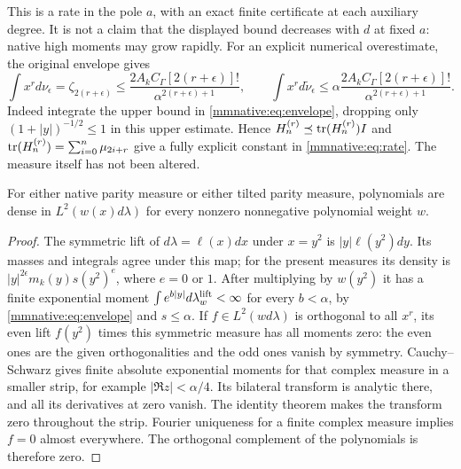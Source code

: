 \documentclass[11pt]{article}
\begin{document}
This is a rate in the pole $a$, with an exact finite certificate at
each auxiliary degree.  It is not a claim that the displayed bound
decreases with $d$ at fixed $a$: native high moments may grow rapidly.
For an explicit numerical overestimate, the original envelope gives
\begin{equation}\label{mmnative:eq:momentcap}
 \int x^r d\nu_\epsilon
 =\zeta_{2(r+\epsilon)}
 \le\frac{2A_kC_\Gamma[2(r+\epsilon)]!}
 {\alpha^{2(r+\epsilon)+1}},\qquad
 \int x^r d\widetilde\nu_\epsilon
 \le\alpha\frac{2A_kC_\Gamma[2(r+\epsilon)]!}
 {\alpha^{2(r+\epsilon)+1}}.
\end{equation}
Indeed integrate the upper bound in \eqref{mmnative:eq:envelope}, dropping
only $(1+|y|)^{-1/2}\le1$ in this upper estimate.  Hence
$H_n^{(r)}\preceq\operatorname{tr}(H_n^{(r)})I$ and
$\operatorname{tr}(H_n^{(r)})=\sum_{i=0}^n\mu_{2i+r}$ give a fully explicit
constant in \eqref{mmnative:eq:rate}.  The measure itself has not been altered.

\begin{mmnativelemma}\label{mmnative:lem:density}
For either native parity measure or either tilted parity measure,
polynomials are dense in $L^2(w(x)d\lambda)$ for every nonzero
nonnegative polynomial weight $w$.
\end{mmnativelemma}
\begin{proof}
The symmetric lift of $d\lambda=\ell(x)dx$ under $x=y^2$ is
$|y|\ell(y^2)dy$.  Its masses and integrals agree under this map;
for the present measures its density is
$|y|^{2\epsilon}m_k(y)s(y^2)^e$, where $e=0$ or $1$.
After multiplying by $w(y^2)$ it has a finite exponential moment
$\int e^{b|y|}d\lambda_w^{\rm lift}<\infty$ for every $b<\alpha$,
by \eqref{mmnative:eq:envelope} and $s\le\alpha$.
If $f\in L^2(wd\lambda)$ is orthogonal to all $x^r$, its even
lift $f(y^2)$ times this symmetric measure has all moments zero:
the even ones are the given orthogonalities and the odd ones vanish
by symmetry.  Cauchy--Schwarz gives finite absolute exponential
moments for that complex measure in a smaller strip, for example
$|\Re z|<\alpha/4$.  Its bilateral transform is analytic there,
and all its derivatives at zero vanish.  The identity theorem makes
the transform zero throughout the strip.  Fourier uniqueness for a
finite complex measure implies $f=0$ almost everywhere.  The
orthogonal complement of the polynomials is therefore zero.
\end{proof}
\end{document}
